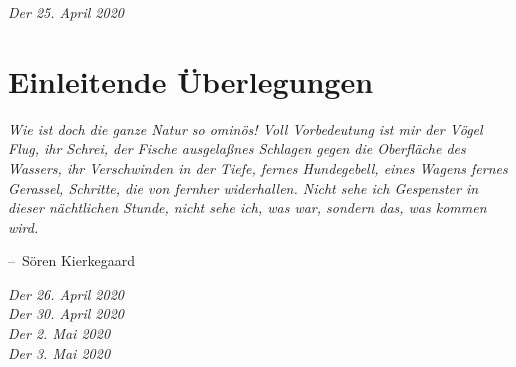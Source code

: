 \documentclass[oneside]{memoir}
\makeatletter
\newenvironment{chapquote}[2][2em]
  {\setlength{\@tempdima}{#1}%
   \def\chapquote@author{#2}%
   \parshape 1 \@tempdima \dimexpr\textwidth-2\@tempdima\relax%
   \itshape}
  {\par\normalfont\hfill--\ \chapquote@author\hspace*{\@tempdima}\par\bigskip}
\makeatother
\begin{document}
     \bigskip \bigskip \bigskip \bigskip
     \textit{Der 25. April 2020} \\ 

\chapter{Einleitende Überlegungen} %
\begin{chapquote}{Sören Kierkegaard}
\glqq Wie ist doch die ganze Natur so ominös! Voll Vorbedeutung ist mir der Vögel Flug, ihr Schrei, der Fische ausgelaßnes Schlagen gegen die Oberfläche des Wassers, ihr Verschwinden in der Tiefe, fernes Hundegebell, eines Wagens fernes Gerassel, Schritte, die von fernher widerhallen. Nicht sehe ich Gespenster in dieser nächtlichen Stunde, nicht sehe ich, was war, sondern das, was kommen wird.\grqq
\end{chapquote}

     
       \bigskip \bigskip \bigskip \bigskip
     \textit{Der 26. April 2020} \\ 
     
       \bigskip \bigskip \bigskip \bigskip
     \textit{Der 30. April 2020} \\ 
     
       \bigskip \bigskip \bigskip \bigskip
     \textit{Der 2. Mai 2020} \\ 
     
       \bigskip \bigskip \bigskip \bigskip
     \textit{Der 3. Mai 2020} \\ 
\end{document}
